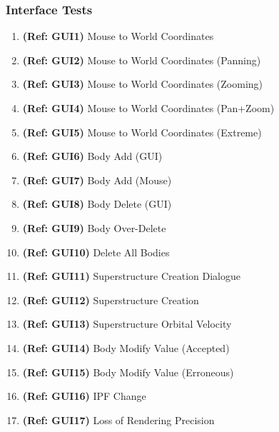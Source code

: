 \subsubsection{Interface Tests}
\vspace{12pt}
\begin{enumerate}
\item \textbf{(Ref: GUI1)} Mouse to World Coordinates
\item \textbf{(Ref: GUI2)} Mouse to World Coordinates (Panning)
\item \textbf{(Ref: GUI3)} Mouse to World Coordinates (Zooming)
\item \textbf{(Ref: GUI4)} Mouse to World Coordinates (Pan+Zoom)
\item \textbf{(Ref: GUI5)} Mouse to World Coordinates (Extreme)
\item \textbf{(Ref: GUI6)} Body Add (GUI)
\item \textbf{(Ref: GUI7)} Body Add (Mouse)
\item \textbf{(Ref: GUI8)} Body Delete (GUI)
\item \textbf{(Ref: GUI9)} Body Over-Delete 
\item \textbf{(Ref: GUI10)} Delete All Bodies 
\item \textbf{(Ref: GUI11)} Superstructure Creation Dialogue
\item \textbf{(Ref: GUI12)} Superstructure Creation
\item \textbf{(Ref: GUI13)} Superstructure Orbital Velocity
\item \textbf{(Ref: GUI14)} Body Modify Value (Accepted)
\item \textbf{(Ref: GUI15)} Body Modify Value (Erroneous)
\item \textbf{(Ref: GUI16)} IPF Change
\item \textbf{(Ref: GUI17)} Loss of Rendering Precision
\end{enumerate}

